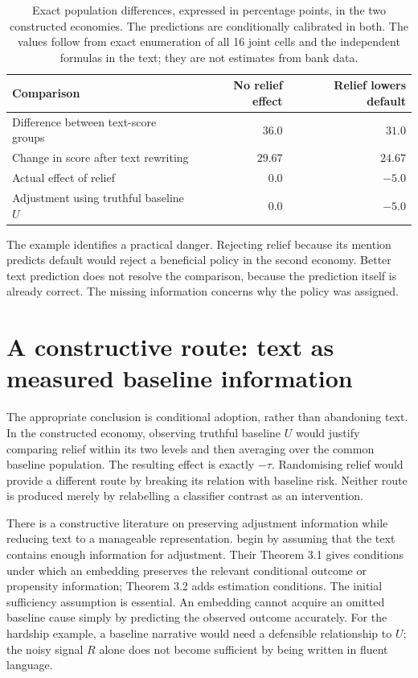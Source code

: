 \begin{table}[htbp]
\centering
\begin{tabular}{lrr}
\toprule
Comparison & No relief effect & Relief lowers default\\
\midrule
Difference between text-score groups & $36.0$ & $31.0$\\
Change in score after text rewriting & $29.67$ & $24.67$\\
Actual effect of relief & $0.0$ & $-5.0$\\
Adjustment using truthful baseline $U$ & $0.0$ & $-5.0$\\
\bottomrule
\end{tabular}
\caption{Exact population differences, expressed in percentage points, in
the two constructed economies. The predictions are conditionally calibrated
in both. The values follow from exact enumeration of all 16 joint cells and
the independent formulas in the text; they are not estimates from bank data.}
\label{closure30:text-results}
\end{table}

The example identifies a practical danger. Rejecting relief because its
mention predicts default would reject a beneficial policy in the second
economy. Better text prediction does not resolve the comparison, because
the prediction itself is already correct. The missing information concerns
why the policy was assigned.

\section{A constructive route: text as measured baseline information}

The appropriate conclusion is conditional adoption, rather than abandoning
text. In the constructed economy, observing truthful baseline $U$ would
justify comparing relief within its two levels and then averaging over the
common baseline population. The resulting effect is exactly $-\tau$.
Randomising relief would provide a different route by breaking its relation
with baseline risk. Neither route is produced merely by relabelling a
classifier contrast as an intervention.

There is a constructive literature on preserving adjustment information
while reducing text to a manageable representation. \citet{closure30veitch}
begin by assuming that the text contains enough information for adjustment.
Their Theorem 3.1 gives conditions under which an embedding preserves the
relevant conditional outcome or propensity information; Theorem 3.2 adds
estimation conditions. The initial sufficiency assumption is essential.
An embedding cannot acquire an omitted baseline cause simply by predicting
the observed outcome accurately. For the hardship example, a baseline
narrative would need a defensible relationship to $U$; the noisy signal $R$
alone does not become sufficient by being written in fluent language.

